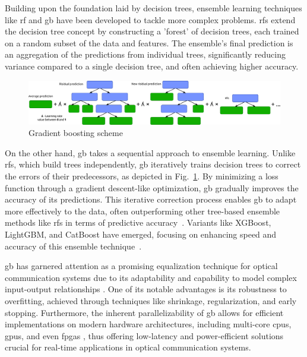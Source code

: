 Building upon the foundation laid by decision trees, ensemble learning techniques like 
\acrfull{rf}
and \acrfull{gb} have been developed to tackle more complex problems. \acrlong{rf}s extend the decision tree concept by constructing a 'forest' of decision trees, each trained on a random subset of the data and features. The ensemble's final prediction is an aggregation of the predictions from individual trees, significantly reducing variance compared to a single decision tree, and often achieving higher accuracy.

\begin{figure}[ht]
   \centering
    \includegraphics[width=1\linewidth]{images/boost/boosting_scheme.pdf}
    \caption{Gradient boosting scheme}
    \label{fig:boosting_scheme}
\end{figure}

On the other hand, \acrlong{gb} takes a sequential approach to ensemble learning. Unlike \acrlong{rf}s, which build trees independently, \acrlong{gb} iteratively trains decision trees to correct the errors of their predecessors, as depicted in Fig.~\ref{fig:boosting_scheme}. By minimizing a loss function through a gradient descent-like optimization, \acrlong{gb} gradually improves the accuracy of its predictions. This iterative correction process enables \acrlong{gb} to adapt more effectively to the data, often outperforming other tree-based ensemble methods like \acrlong{rf}s in terms of predictive accuracy~\cite{natekin2013gradient}. Variants like XGBoost, LightGBM, and CatBoost have emerged, focusing on enhancing speed and accuracy of this ensemble technique~\cite{bentejac2021comparative}.


\acrlong{gb} has garnered attention as a promising equalization technique for optical communication systems due to its adaptability and capability to model complex input-output relationships \cite{Chen:2016:XST:2939672.2939785,natekin2013gradient,friedman2002stochastic,bentejac2021comparative}. One of its notable advantages is its robustness to overfitting, achieved through techniques like shrinkage, regularization, and early stopping. Furthermore, the inherent parallelizability of \acrlong{gb} allows for efficient implementations on modern hardware architectures, including multi-core \acrshort{cpu}s, \acrshort{gpu}s, and even \acrshort{fpga}s \cite{alcolea2021fpga}, thus offering low-latency and power-efficient solutions crucial for real-time applications in optical communication systems.

